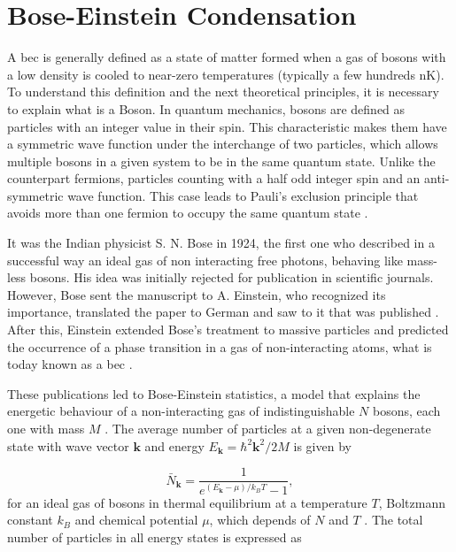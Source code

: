\section{Bose-Einstein Condensation} \label{sec:bose-einstein_condensation}

A \ac{bec} is generally defined as a state of matter formed when a gas of bosons with a low density is cooled to near-zero temperatures (typically a few hundreds \si{\nano\kelvin}). To understand this definition and the next theoretical principles, it is necessary to explain what is a Boson. In quantum mechanics, bosons are defined as particles with an integer value in their spin. This characteristic makes them have a symmetric wave function under the interchange of two particles, which allows multiple bosons in a given system to be in the same quantum state. Unlike the counterpart fermions, particles counting with a half odd integer spin and an anti-symmetric wave function. This case leads to Pauli's exclusion principle that avoids more than one fermion to occupy the same quantum state \cite{Pauli1925}.

It was the Indian physicist S. N. Bose in 1924, the first one who described in a successful way an ideal gas of non interacting free photons, behaving like mass-less bosons. His idea was initially rejected for publication in scientific journals. However, Bose sent the manuscript to A. Einstein, who recognized its importance, translated the paper to German and saw to it that was published \cite{Bose1924}. After this, Einstein extended Bose's treatment to massive particles and predicted the occurrence of a phase transition in a gas of non-interacting atoms, what is today known as a \ac{bec} \cite{Einstein1924, Einstein1925}.

These publications led to Bose-Einstein statistics, a model that explains the energetic behaviour of a non-interacting gas of indistinguishable $N$ bosons, each one with mass $M$ \cite{Masahito2010, Pethick2008}. The average number of particles at a given non-degenerate state with wave vector $\mathbf{k}$ and energy $E_\mathbf{k} = \hbar^2 \mathbf{k}^2 / 2M$ is given by

\begin{equation}\label{eq:bose-einstein_distribution}
	\bar{N}_{\mathbf{k}} = \frac{1}{e^{(E_\mathbf{k} - \mu)/k_B T} - 1},
\end{equation}
for an ideal gas of bosons in thermal equilibrium at a temperature $T$, Boltzmann constant $k_B$ and chemical potential $\mu$, which depends of $N$ and $T$ \cite{Masahito2010}. The total number of particles in all energy states is expressed as


